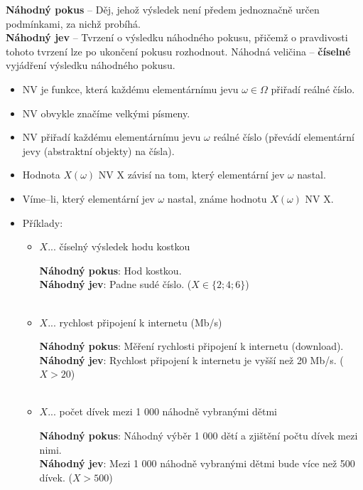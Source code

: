 \textbf{Náhodný pokus} -- Děj, jehož výsledek není předem jednoznačně určen podmínkami, za nichž probíhá.\\
\textbf{Náhodný jev} -- Tvrzení o výsledku náhodného pokusu, přičemž o pravdivosti tohoto tvrzení lze po ukončení pokusu rozhodnout.
Náhodná veličina  -- \textbf{číselné} vyjádření výsledku náhodného pokusu.\\
\begin{itemize}
	\item NV je funkce, která každému elementárnímu jevu $\omega \in \Omega$ přiřadí reálné číslo.
	\item NV obvykle značíme velkými písmeny.
	\item NV přiřadí každému elementárnímu jevu $\omega$ reálné číslo (převádí elementární jevy (abstraktní objekty) na čísla).
	\item Hodnota $X(\omega)$ NV X závisí na tom, který elementární jev $\omega$ nastal.
	\item Víme--li, který elementární jev $\omega$ nastal, známe hodnotu $X(\omega)$ NV X.
	\item Příklady:
	\begin{itemize}
		\item[]	\begin{center}
			$X$... číselný výsledek hodu kostkou\\
			\end{center}
			\textbf{Náhodný pokus}: Hod kostkou. \\
			\textbf{Náhodný jev}: Padne sudé číslo. ($X \in \{2;4;6\}$) \\\\
			
		\item[]	\begin{center}
			$X$... rychlost připojení k internetu (Mb/s) \\
			\end{center}
			\textbf{Náhodný pokus}: Měření rychlosti připojení k internetu (download). \\
			\textbf{Náhodný jev}: Rychlost připojení k internetu je vyšší než 20 Mb/s.  ($X > 20$)\\\\
			
		\item[]	\begin{center}
			$X$... počet dívek mezi 1 000 náhodně vybranými dětmi \\
			\end{center}
			\textbf{Náhodný pokus}: Náhodný výběr 1 000 dětí a zjištění počtu dívek mezi nimi. \\
			\textbf{Náhodný jev}: Mezi 1 000 náhodně vybranými dětmi bude více než 500 dívek. ($X > 500$)
	\end{itemize}

\end{itemize}





